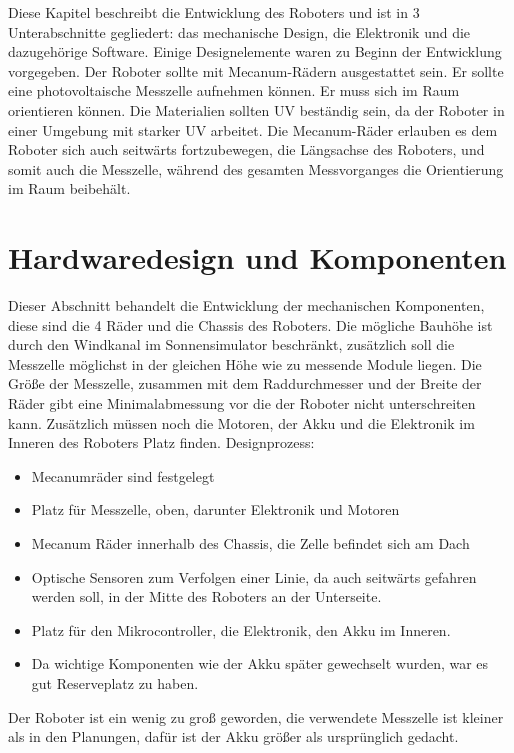\documentclass[a4paper,bibtotoc,oneside]{scrbook}
\begin{document}
Diese Kapitel beschreibt die Entwicklung des Roboters und ist in 3 Unterabschnitte gegliedert: das mechanische Design, die Elektronik und die dazugehörige Software.
Einige Designelemente waren zu Beginn der Entwicklung vorgegeben. Der Roboter sollte mit Mecanum-Rädern ausgestattet sein. Er sollte eine photovoltaische Messzelle aufnehmen können. Er muss sich im Raum orientieren können. Die Materialien sollten UV beständig sein, da der Roboter in einer Umgebung mit starker UV arbeitet.
Die Mecanum-Räder erlauben es dem Roboter sich auch seitwärts fortzubewegen, die Längsachse des Roboters, und somit auch die Messzelle, während des gesamten Messvorganges die Orientierung im Raum beibehält. 

\section{Hardwaredesign und Komponenten}\thispagestyle{empty}

Dieser Abschnitt behandelt die Entwicklung der mechanischen Komponenten, diese sind die 4 Räder und die Chassis des Roboters. Die mögliche Bauhöhe ist durch den Windkanal im Sonnensimulator beschränkt, zusätzlich soll die Messzelle möglichst in der gleichen Höhe wie zu messende Module liegen.
Die Größe der Messzelle, zusammen mit dem Raddurchmesser und der Breite der Räder gibt eine Minimalabmessung vor die der Roboter nicht unterschreiten kann. Zusätzlich müssen noch die Motoren, der Akku und die Elektronik im Inneren des Roboters Platz finden.
Designprozess:
\begin{itemize}
\item Mecanumräder sind festgelegt
\item  Platz für Messzelle, oben, darunter Elektronik und Motoren
\item  Mecanum Räder innerhalb des Chassis, die Zelle befindet sich  am Dach
\item  Optische Sensoren zum Verfolgen einer Linie, da auch seitwärts gefahren werden soll, in der Mitte des Roboters an der Unterseite.
\item  Platz für den Mikrocontroller, die Elektronik, den Akku im Inneren. 
\item  Da wichtige Komponenten wie der Akku später gewechselt wurden, war es gut Reserveplatz zu haben.\end{itemize}

Der Roboter ist ein wenig zu groß geworden, die verwendete Messzelle ist kleiner als in den Planungen, dafür ist der Akku größer als ursprünglich gedacht. 
\end{document}
